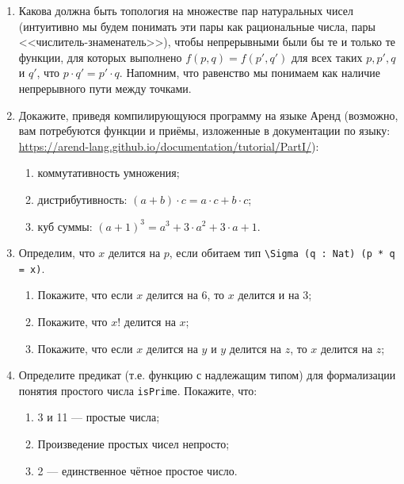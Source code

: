 \documentclass[10pt,a4paper,oneside]{article}
\begin{document}
\begin{enumerate}

\item Какова должна быть топология на множестве
пар натуральных чисел (интуитивно мы будем понимать эти пары как рациональные числа, пары <<числитель-знаменатель>>), 
чтобы непрерывными были бы те и только те функции, для которых выполнено $f(p,q) = f(p',q')$ для всех 
таких $p,p',q$ и $q'$, что $p\cdot q' = p'\cdot q$. Напомним, что равенство мы понимаем как наличие непрерывного пути 
между точками.

\item Докажите, приведя компилирующуюся программу на языке Аренд (возможно, вам потребуются функции и приёмы, 
изложенные в документации по языку: \url{https://arend-lang.github.io/documentation/tutorial/PartI/}):
\begin{enumerate}
\item коммутативность умножения;
\item дистрибутивность: $(a + b)\cdot c = a\cdot c + b \cdot c$;
\item куб суммы: $(a + 1)^3 = a^3 + 3\cdot a^2 + 3 \cdot a + 1$.
\end{enumerate}

\item Определим, что $x$ делится на $p$, если обитаем тип \verb!\Sigma (q : Nat) (p * q = x)!.
\begin{enumerate}
\item Покажите, что если $x$ делится на 6, то $x$ делится и на 3;
\item Покажите, что $x!$ делится на $x$;
\item Покажите, что если $x$ делится на $y$ и $y$ делится на $z$, то $x$ делится на $z$;
\end{enumerate}

\item Определите предикат (т.е. функцию с надлежащим типом) для формализации понятия простого числа \verb!isPrime!.
Покажите, что:
\begin{enumerate}
\item 3 и 11 --- простые числа;
\item Произведение простых чисел непросто;
\item 2 --- единственное чётное простое число.
\end{enumerate}


\end{enumerate}
\end{document}
